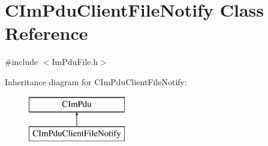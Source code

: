 \hypertarget{class_c_im_pdu_client_file_notify}{}\section{C\+Im\+Pdu\+Client\+File\+Notify Class Reference}
\label{class_c_im_pdu_client_file_notify}


{\ttfamily \#include $<$Im\+Pdu\+File.\+h$>$}

Inheritance diagram for C\+Im\+Pdu\+Client\+File\+Notify\+:\begin{figure}[H]
\begin{center}
\leavevmode
\includegraphics[height=2.000000cm]{class_c_im_pdu_client_file_notify}
\end{center}
\end{figure}
